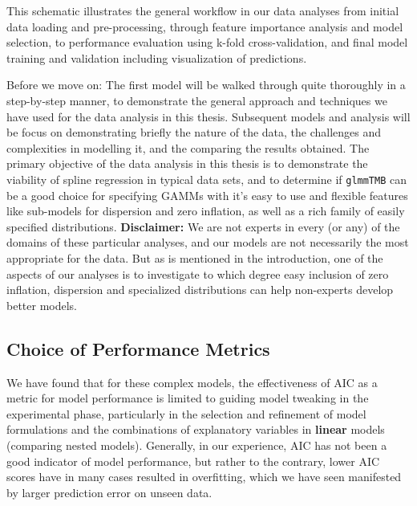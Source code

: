 \documentclass[12pt, twoside,hidelinks]{article}
\theoremstyle{definition}
\numberwithin{equation}{section}
\begin{document}
This schematic illustrates the general workflow in our data analyses from initial data loading and pre-processing, through feature importance analysis and model selection, to performance evaluation using k-fold cross-validation, and final model training and validation including visualization of predictions.
\newline

Before we move on: The first model will be walked through quite thoroughly in a step-by-step manner, to demonstrate the general approach and techniques we have used for the data analysis in this thesis. Subsequent models and analysis will be focus on demonstrating briefly the nature of the data, the challenges and complexities in modelling it, and the comparing the results obtained. The primary objective of the data analysis in this thesis is to demonstrate the viability of spline regression in typical data sets, and to determine if \texttt{glmmTMB} can be a good choice for specifying GAMMs with it's easy to use and flexible features like sub-models for dispersion and zero inflation, as well as a rich family of easily specified distributions.
\newline
\textbf{Disclaimer:} We are not experts in every (or any) of the domains of these particular analyses, and our models are not necessarily the most appropriate for the data. But as is mentioned in the introduction, one of the aspects of our analyses is to investigate to which degree easy inclusion of zero inflation, dispersion and specialized distributions can help non-experts develop better models. 


\subsection{Choice of Performance Metrics} 

We have found that for these complex models, the effectiveness of AIC as a metric for model performance is limited to guiding model tweaking in the experimental phase, particularly in the selection and refinement of model formulations and the combinations of explanatory variables in \textbf{linear} models (comparing nested models). Generally, in our experience, AIC has not been a good indicator of model performance, but rather to the contrary, lower AIC scores have in many cases resulted in overfitting, which we have seen manifested by larger prediction error on unseen data.
\end{document}
